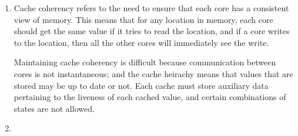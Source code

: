 \documentclass{report}
\begin{document}
  \item \begin{enumerate}
    \item Cache coherency refers to the need to ensure that each core
      has a consistent view of memory. This means that for any
      location in memory, each core should get the same value if it
      tries to read the location, and if a core writes to the
      location, then all the other cores will immediately see the
      write.

      Maintaining cache coherency is difficult because communication
      between cores is not instantaneous; and the cache heirachy means
      that values that are stored may be up to date or not. Each cache
      must store auxiliary data pertaining to the liveness of each
      cached value, and certain combinations of states are not allowed.
    \item 
\end{enumerate}
\end{document}
